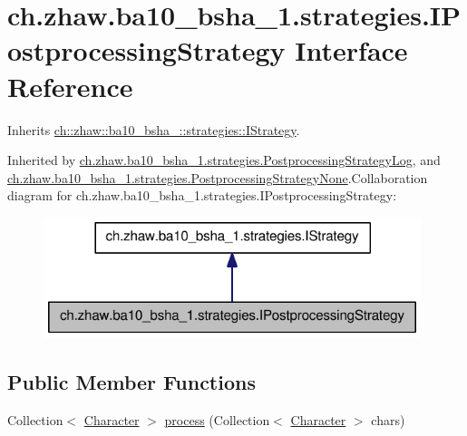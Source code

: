 \hypertarget{interfacech_1_1zhaw_1_1ba10__bsha__1_1_1strategies_1_1IPostprocessingStrategy}{
\section{ch.zhaw.ba10\_\-bsha\_\-1.strategies.IPostprocessingStrategy Interface Reference}
\label{interfacech_1_1zhaw_1_1ba10__bsha__1_1_1strategies_1_1IPostprocessingStrategy}
}


Inherits \hyperlink{interfacech_1_1zhaw_1_1ba10__bsha__1_1_1strategies_1_1IStrategy}{ch::zhaw::ba10\_\-bsha\_::strategies::IStrategy}.

Inherited by \hyperlink{classch_1_1zhaw_1_1ba10__bsha__1_1_1strategies_1_1PostprocessingStrategyLog}{ch.zhaw.ba10\_\-bsha\_\-1.strategies.PostprocessingStrategyLog}, and \hyperlink{classch_1_1zhaw_1_1ba10__bsha__1_1_1strategies_1_1PostprocessingStrategyNone}{ch.zhaw.ba10\_\-bsha\_\-1.strategies.PostprocessingStrategyNone}.Collaboration diagram for ch.zhaw.ba10\_\-bsha\_\-1.strategies.IPostprocessingStrategy:\nopagebreak
\begin{figure}[H]
\begin{center}
\leavevmode
\includegraphics[width=312pt]{interfacech_1_1zhaw_1_1ba10__bsha__1_1_1strategies_1_1IPostprocessingStrategy__coll__graph}
\end{center}
\end{figure}
\subsection*{Public Member Functions}
\begin{DoxyCompactItemize}
\item 
Collection$<$ \hyperlink{classch_1_1zhaw_1_1ba10__bsha__1_1_1Character}{Character} $>$ \hyperlink{interfacech_1_1zhaw_1_1ba10__bsha__1_1_1strategies_1_1IPostprocessingStrategy_a0bb435d4c5cb8ce3b3909ad81961d912}{process} (Collection$<$ \hyperlink{classch_1_1zhaw_1_1ba10__bsha__1_1_1Character}{Character} $>$ chars)
\end{DoxyCompactItemize}


